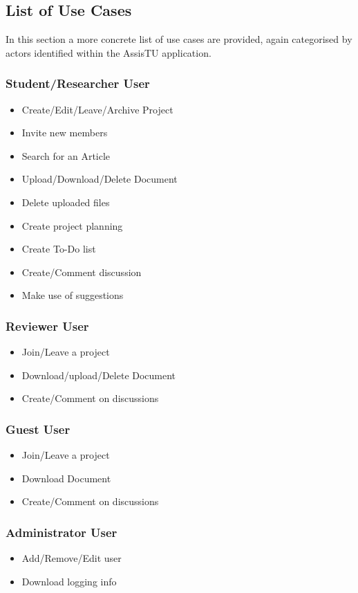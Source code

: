 \subsection{List of Use Cases} %
\label{sub:list_of_use_cases}
In this section a more concrete list of use cases are provided, again categorised by actors identified within the AssisTU application.
\subsubsection{Student/Researcher User} 
\begin{itemize}
	\item Create/Edit/Leave/Archive Project
	\item Invite new members
	\item Search for an Article
	\item Upload/Download/Delete Document
	\item Delete uploaded files
	\item Create project planning
	\item Create To-Do list
	\item Create/Comment discussion
	\item Make use of suggestions
\end{itemize}
\subsubsection{Reviewer User} 
\begin{itemize}
	\item Join/Leave a project
	\item Download/upload/Delete Document
	\item Create/Comment on discussions
\end{itemize}

\subsubsection{Guest User} 
\begin{itemize}
	\item Join/Leave a project
	\item Download Document
	\item Create/Comment on discussions
\end{itemize}	

\subsubsection{Administrator User} 
\begin{itemize}
	\item Add/Remove/Edit user	
	\item Download logging info
\end{itemize}

